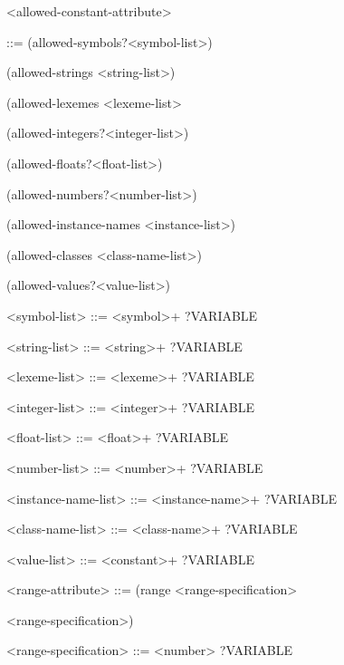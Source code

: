 \documentclass[letterpaper,10pt,english]{sphinxmanual}
\begin{document}
\textless{}allowed-constant-attribute\textgreater{}

::= (allowed-symbols?\textless{}symbol-list\textgreater{}) \textbar{}

(allowed-strings \textless{}string-list\textgreater{}) \textbar{}

(allowed-lexemes \textless{}lexeme-list\textgreater{} \textbar{}

(allowed-integers?\textless{}integer-list\textgreater{}) \textbar{}

(allowed-floats?\textless{}float-list\textgreater{}) \textbar{}

(allowed-numbers?\textless{}number-list\textgreater{}) \textbar{}

(allowed-instance-names \textless{}instance-list\textgreater{}) \textbar{}

(allowed-classes \textless{}class-name-list\textgreater{}) \textbar{}

(allowed-values?\textless{}value-list\textgreater{})

\textless{}symbol-list\textgreater{} ::= \textless{}symbol\textgreater{}+ \textbar{} ?VARIABLE

\textless{}string-list\textgreater{} ::= \textless{}string\textgreater{}+ \textbar{} ?VARIABLE

\textless{}lexeme-list\textgreater{} ::= \textless{}lexeme\textgreater{}+ \textbar{} ?VARIABLE

\textless{}integer-list\textgreater{} ::= \textless{}integer\textgreater{}+ \textbar{} ?VARIABLE

\textless{}float-list\textgreater{} ::= \textless{}float\textgreater{}+ \textbar{} ?VARIABLE

\textless{}number-list\textgreater{} ::= \textless{}number\textgreater{}+ \textbar{} ?VARIABLE

\textless{}instance-name-list\textgreater{} ::= \textless{}instance-name\textgreater{}+ \textbar{} ?VARIABLE

\textless{}class-name-list\textgreater{} ::= \textless{}class-name\textgreater{}+ \textbar{} ?VARIABLE

\textless{}value-list\textgreater{} ::= \textless{}constant\textgreater{}+ \textbar{} ?VARIABLE

\textless{}range-attribute\textgreater{} ::= (range \textless{}range-specification\textgreater{}

\textless{}range-specification\textgreater{})

\textless{}range-specification\textgreater{} ::= \textless{}number\textgreater{} \textbar{} ?VARIABLE
\end{document}
